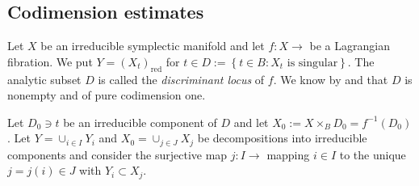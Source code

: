 \documentclass[a4paper,11pt,final]{amsart}
\theoremstyle{plain}
\theoremstyle{definition}
\numberwithin{equation}{section}
\theoremstyle{remark}
\begin{document}
\subsection{Codimension estimates}\label{subsec codimension}
Let $X$ be an irreducible symplectic manifold and let $f:X{\xrightarrow{\ \ }}$ be a Lagrangian fibration. 
We put $Y=\left(X_t\right)_{{\operatorname{red}}}$ for $t \in D := \left\{t\in B: X_t \textrm{ is singular}\right\}$. The analytic subset $D$ is called the \emph{discriminant locus} of $f$. 
We know by \cite[Prop 4.1]{Hw} and \cite[Prop 3.1]{HO07} that $D$ is nonempty and of pure codimension one. 

Let $D_0\ni t$ be an irreducible component of $D$ and let $X_0:=X\times_{B}D_0 = f^{-1}(D_0)$. Let $Y=\cup_{i\in I} Y_i$ and $X_0=\cup_{j\in J} X_j$ be decompositions into irreducible components and consider the surjective map $j:I{\xrightarrow{\ \ }}$ mapping $i\in I$ to the unique $j=j(i)\in J$ with $Y_i \subset X_j$.
\end{document}
